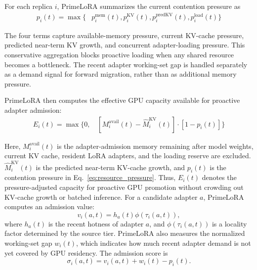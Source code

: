 \documentclass[lettersize,journal]{IEEEtran}
\begin{document}
For each replica $i$, PrimeLoRA summarizes the current contention pressure as
\begin{equation}
\begin{aligned}
p_i(t)=
\max\{&
p_i^{\mathrm{mem}}(t),
p_i^{\mathrm{KV}}(t), 
p_i^{\mathrm{predKV}}(t),
p_i^{\mathrm{load}}(t)
\}
\end{aligned}
\label{eq:resource_pressure}
\end{equation}

The four terms capture available-memory pressure, current KV-cache pressure, predicted near-term KV growth, and concurrent adapter-loading pressure. This conservative aggregation blocks proactive loading when any shared resource becomes a bottleneck. The recent adapter working-set gap is handled separately as a demand signal for forward migration, rather than as additional memory pressure.

PrimeLoRA then computes the effective GPU capacity available for proactive adapter admission:
\begin{equation}
\begin{aligned}
E_i(t)=
\max\{0,\,
&[M_i^{\mathrm{avail}}(t)
-\widehat{M}_i^{\mathrm{KV}}(t)] \cdot [1-p_i(t)]\}
\end{aligned}
\label{eq:effective_capacity}
\end{equation}

Here, $M_i^{\mathrm{avail}}(t)$ is the adapter-admission memory remaining after model weights, current KV cache, resident LoRA adapters, and the loading reserve are excluded. $\widehat{M}_i^{\mathrm{KV}}(t)$ is the predicted near-term KV-cache growth, and $p_i(t)$ is the contention pressure in Eq.~\ref{eq:resource_pressure}. Thus, $E_i(t)$ denotes the pressure-adjusted capacity for proactive GPU promotion without crowding out KV-cache growth or batched inference.
For a candidate adapter $a$, PrimeLoRA computes an admission value:
\begin{equation}
v_i(a,t)=h_a(t)\phi(\tau_i(a,t)),
\label{eq:admission_value}
\end{equation}
where $h_a(t)$ is the recent hotness of adapter $a$, and $\phi(\tau_i(a,t))$ is a locality factor determined by the source tier. PrimeLoRA also measures the normalized working-set gap $w_i(t)$, which indicates how much recent adapter demand is not yet covered by GPU residency. The admission score is
\begin{equation}
\sigma_i(a,t)=v_i(a,t)+w_i(t)-p_i(t).
\label{eq:admission_score}
\end{equation}
\end{document}
